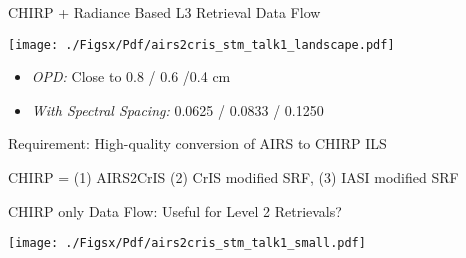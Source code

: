 \documentclass[10pt,t]{beamer}
\begin{document}
\begin{frame}[label={sec:orgb0eba3b}]{CHIRP + Radiance Based L3 Retrieval Data Flow}
\begin{center}
\texttt{[image: ./Figsx/Pdf/airs2cris\_stm\_talk1\_landscape.pdf]}
\end{center}

\begin{itemize}
\item \emph{OPD:} Close to 0.8 / 0.6 /0.4 cm
\item \emph{With Spectral Spacing:} 0.0625 / 0.0833 / 0.1250 \wn
\end{itemize}

Requirement: High-quality conversion of AIRS to CHIRP ILS

CHIRP = (1) AIRS2CrIS (2) CrIS modified SRF, (3) IASI modified SRF
\end{frame}

\begin{frame}[label={sec:org5b36511}]{CHIRP only Data Flow: Useful for Level 2 Retrievals?}
\vspace{-0.1in}

\begin{center}
\texttt{[image: ./Figsx/Pdf/airs2cris\_stm\_talk1\_small.pdf]}
\end{center}

\vspace{-0.1in}
\end{frame}
\end{document}
